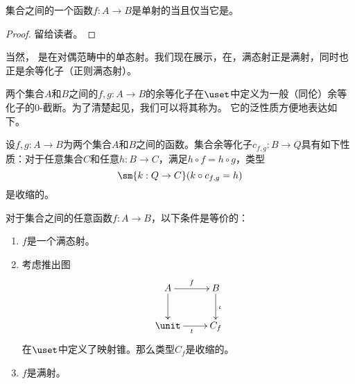 \begin{lem}\label{thm:inj-mono}
集合之间的一个函数$f:A\to B$是单射的当且仅当它是。
\end{lem}
\begin{proof}
  留给读者。
\end{proof}

当然，
%
%
是在对偶范畴中的单态射。我们现在展示，在，满态射正是满射，同时也正是余等化子（正则满态射）。

两个集合$A$和$B$之间的$f,g:A\to B$的余等化子在$\uset$中定义为一般（同伦）余等化子的$0$-截断。为了清楚起见，我们可以将其称为。
%
%
它的泛性质方便地表达如下。

\begin{lem}
  设$f,g:A\to B$为两个集合$A$和$B$之间的函数。{集合余}等化子$c_{f,g}:B\to Q$具有如下性质：对于任意集合$C$和任意$h:B\to C$，满足$h\circ f = h\circ g$，类型
  \begin{equation*}
    \sm{k:Q\to C} (k\circ c_{f,g} = h)
  \end{equation*}
  是收缩的。
\end{lem}

\begin{lem}\label{epis-surj}
对于集合之间的任意函数$f:A\to B$，以下条件是等价的：
\begin{enumerate}
  \item $f$是一个满态射。
  \item 考虑推出图
  \begin{equation*}
    \xymatrix{
        {A}
      \ar[r]^{f}
      \ar[d]
      &
        {B}
      \ar[d]^{\iota}
      \\
      {\unit}
      \ar[r]_{t}
      &
        {C_f}
    }
  \end{equation*}
  在$\uset$中定义了映射锥。那么类型$C_f$是收缩的。
  \item $f$是满射。
\end{enumerate}
\end{lem}

